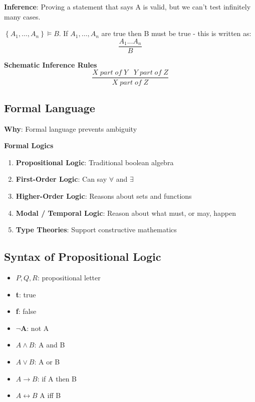 \documentclass{article}
\begin{document}
\textbf{Inference}: Proving a statement that says A is valid, but we can't test infinitely many cases.

\bigskip
$\left\{A_{1}, \dots, A_{n}\right\} \vDash B$. If $A_{1}, \dots, A_{n}$ are true then B must be true - this is written as:
\begin{equation}
    \frac{A_{1} ... A_{n}}{B}
\end{equation}

\bigskip
\textbf{Schematic Inference Rules}
\begin{equation}
    \frac{X \; part \; of \; Y \; \; \; Y \; part \; of \; Z}{X \; part \; of \; Z}
\end{equation}

\subsection{Formal Language}
\textbf{Why}: Formal language prevents ambiguity

\bigskip
\noindent
\textbf{Formal Logics}
\begin{enumerate}
    \item \textbf{Propositional Logic}: Traditional boolean algebra
    \item \textbf{First-Order Logic}: Can say $\forall$ and $\exists$
    
    \item \textbf{Higher-Order Logic}: Reasons about sets and functions
    
    \item \textbf{Modal / Temporal Logic}: Reason about what must, or may, happen
    
    \item \textbf{Type Theories}: Support constructive mathematics
\end{enumerate}

\subsection{Syntax of Propositional Logic}
\begin{itemize}
    \item $P, Q, R$: propositional letter
    \item \textbf{t}: true
    \item \textbf{f}: false
    \item \textbf{$\neg$A}: not A
    \item \textbf{$A \wedge B$}: A and B
    \item \textbf{$A \vee B$}: A or B
    \item \textbf{$A \rightarrow B$}: if A then B
    \item \textbf{$A \leftrightarrow B$} A iff B
\end{itemize}
\end{document}
